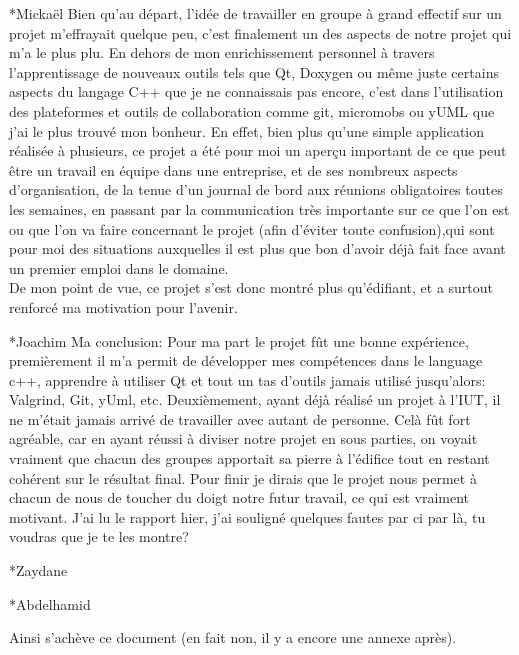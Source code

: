 \documentclass[a4paper, 12pt]{report}
\begin{document}
\begin{chapter}
		\begin{section}*{Mickaël}
		Bien qu'au départ, l'idée de travailler en groupe à grand effectif sur un projet m'effrayait quelque peu, c'est finalement un des aspects de notre 		   projet qui m'a le plus plu.
		En dehors de mon enrichissement personnel à travers l'apprentissage de nouveaux outils tels que Qt, Doxygen ou même juste certains aspects du
		langage C++ que je ne connaissais pas encore, c'est dans l'utilisation des plateformes et outils de collaboration comme git, micromobs ou yUML
		que j'ai le plus trouvé mon bonheur. En effet, bien plus qu'une simple application réalisée à plusieurs, ce projet a été pour moi un aperçu
		important de ce que peut être un travail en équipe dans une entreprise, et de ses nombreux aspects d'organisation, de la tenue d'un journal de
		bord aux réunions obligatoires toutes les semaines, en passant par la communication très importante sur ce que l'on est ou que l'on va faire
		concernant le projet (afin d'éviter toute confusion),qui sont pour moi des situations auxquelles il est plus que bon d'avoir déjà fait face
		avant un premier emploi dans le domaine.\\
		De mon point de vue, ce projet s'est donc montré plus qu'édifiant, et a surtout renforcé ma motivation pour l'avenir.\\
		\end{section}

		\begin{section}*{Joachim}
		Ma conclusion: Pour ma part le projet fût une bonne expérience, premièrement il m'a permit de développer mes compétences dans le language c++, apprendre à utiliser Qt et tout un tas d'outils jamais utilisé jusqu'alors: Valgrind, Git, yUml, etc.
Deuxièmement, ayant déjà réalisé un projet à l'IUT, il ne m'était jamais arrivé de travailler avec autant de personne. Celà fût fort agréable, car en ayant réussi à diviser notre projet en sous parties, on voyait vraiment que chacun des groupes apportait sa pierre à l'édifice tout en restant cohérent sur le résultat final.
Pour finir je dirais que le projet nous permet à chacun de nous de toucher du doigt notre futur travail, ce qui est vraiment motivant.
J'ai lu le rapport hier, j'ai souligné quelques fautes par ci par là, tu voudras que je te les montre?
		\end{section}

		\begin{section}*{Zaydane}
		\end{section}

		\begin{section}*{Abdelhamid}
		\end{section}

		Ainsi s'achève ce document (en fait non, il y a encore une annexe après).\\
	\end{chapter}
\end{document}

